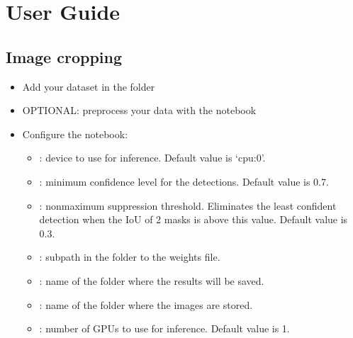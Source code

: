 \documentclass[letterpaper,10pt,english]{sphinxmanual}
\begin{document}
\chapter{User Guide}
\label{\detokenize{index:user-guide}}

\section{Image cropping}
\label{\detokenize{index:image-cropping}}\begin{itemize}
\item {} 
\sphinxAtStartPar
Add your dataset in the folder 

\item {} 
\sphinxAtStartPar
OPTIONAL: preprocess your data with the  notebook

\item {} 
\sphinxAtStartPar
Configure the  notebook:
\begin{itemize}
\item {} 
\sphinxAtStartPar
{}: device to use for inference. Default value is ‘cpu:0’.

\item {} 
\sphinxAtStartPar
{}: minimum confidence level for the detections. Default value is 0.7.

\item {} 
\sphinxAtStartPar
{}: non\sphinxhyphen{}maximum suppression threshold. Eliminates the least confident detection when the IoU of 2 masks is above this value. Default value is 0.3.

\item {} 
\sphinxAtStartPar
{}: subpath in the  folder to the weights file.

\item {} 
\sphinxAtStartPar
{}: name of the folder where the results will be saved.

\item {} 
\sphinxAtStartPar
{}: name of the folder where the images are stored.

\item {} 
\sphinxAtStartPar
{}: number of GPUs to use for inference. Default value is 1.


\end{itemize}
\end{itemize}
\end{document}
